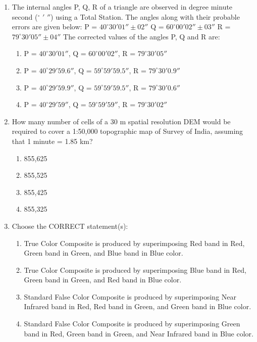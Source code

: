 \documentclass[12pt,a4paper]{article}
\begin{document}
\begin{enumerate}
\item The internal angles P, Q, R of a triangle are observed in degree minute second ($^\circ$ $'$ $''$) using a Total Station. The angles along with their probable errors are given below:  
P = $40^\circ 30' 01'' \pm 02''$  
Q = $60^\circ 00' 02'' \pm 03''$  
R = $79^\circ 30' 05'' \pm 04''$  
The corrected values of the angles P, Q and R are:
\begin{enumerate}
    \item P = $40^\circ 30' 01''$, Q = $60^\circ 00' 02''$, R = $79^\circ 30' 05''$
    \item P = $40^\circ 29' 59.6''$, Q = $59^\circ 59' 59.5''$, R = $79^\circ 30' 0.9''$
    \item P = $40^\circ 29' 59.9''$, Q = $59^\circ 59' 59.5''$, R = $79^\circ 30' 0.6''$
    \item P = $40^\circ 29' 59''$, Q = $59^\circ 59' 59''$, R = $79^\circ 30' 02''$
\end{enumerate}

\item How many number of cells of a 30 m spatial resolution DEM would be required to cover a 1:50,000 topographic map of Survey of India, assuming that 1 minute = 1.85 km?
\begin{enumerate}
    \item 855,625
    \item 855,525
    \item 855,425
    \item 855,325
\end{enumerate}

\item Choose the CORRECT statement(s):
\begin{enumerate}
    \item True Color Composite is produced by superimposing Red band in Red, Green band in Green, and Blue band in Blue color.
    \item True Color Composite is produced by superimposing Blue band in Red, Green band in Green, and Red band in Blue color.
    \item Standard False Color Composite is produced by superimposing Near Infrared band in Red, Red band in Green, and Green band in Blue color.
    \item Standard False Color Composite is produced by superimposing Green band in Red, Green band in Green, and Near Infrared band in Blue color.
\end{enumerate}


\end{enumerate}
\end{document}
